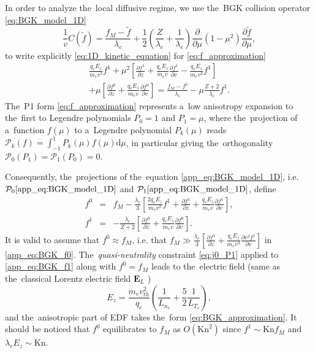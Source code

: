 \documentclass[
 aps,
 jmp,
 amsmath,amssymb,
 twocolumn,
]{revtex4-1}
\newcommand{\pdv}[2]{\frac{\partial{#1}}{\partial{#2}}}
\newcommand{\vect}[1]{\boldsymbol{#1}}
\newcommand{\dI}{\text{d}}
\newcommand{\mfpe}{\lambda_e}
\newcommand{\Zbar}{Z}
\newcommand{\vmag}{v}
\newcommand{\vth}{v_{th}}
\newcommand{\E}{\vect{E}}
\newcommand{\Ez}{E_z}
\newcommand{\qe}{q_e}
\newcommand{\me}{m_e}
\newcommand{\fM}{f_M}
\newcommand{\ft}{f}
\begin{document}
In order to analyze the~local diffusive regime, 
we use the~BGK collision operator 
\eqref{eq:BGK_model_1D} 
\begin{equation}
  \frac{1}{\vmag}C(\tilde{\ft})
  =
  \frac{\fM - \tilde{\ft}}{\mfpe}
  + \frac{1}{2}\left(\frac{\Zbar}{\mfpe} + \frac{1}{\mfpe}\right)
  \pdv{}{\mu}(1 - \mu^2)\pdv{\tilde{\ft}}{\mu} 
  ,\nonumber
\end{equation}
to write explicitly \eqref{eq:1D_kinetic_equation} 
for \eqref{eq:f_approximation} 
\begin{multline}
  \frac{\qe\Ez}{\me\vmag^2} \ft^1 
  + \mu^2\left[\pdv{\ft^1}{z} 
  + \frac{\qe\Ez}{\me\vmag}\pdv{\ft^1}{\vmag} - \frac{\qe\Ez}{\me\vmag^2} \ft^1
  \right] \\ 
  + \mu\left[\pdv{\ft^0}{z} 
  + \frac{\qe\Ez}{\me\vmag}\pdv{\ft^0}{\vmag}\right] = 
  \frac{\fM - \ft^0}{\mfpe} - \mu \frac{\Zbar + 2}{\mfpe}\ft^1
  .
  \label{app_eq:BGK_model_1D}
\end{multline}
The~P1 form \eqref{eq:f_approximation} represents a~low anisotropy
expansion to the~first to Legendre polynomials $P_0 = 1$ and $P_1 = \mu$, 
where the~projection of a~function $f(\mu)$ 
to a~Legendre polynomial $P_k(\mu)$ reads
$\mathcal{P}_k(f) = \int_{-1}^1 P_k(\mu) f(\mu) \dI\mu$, in particular giving
the~orthogonality $\mathcal{P}_0(P_1) = \mathcal{P}_1(P_0) = 0$.

Consequently, the~projections of the~equation \eqref{app_eq:BGK_model_1D}, 
i.e. $\mathcal{P}_0\eqref{app_eq:BGK_model_1D}$ 
and $\mathcal{P}_1\eqref{app_eq:BGK_model_1D}$, define 
\begin{eqnarray}
    \ft^0 &=& \fM - \frac{\mfpe}{3}\left[\frac{2\qe\Ez}{\me\vmag^2} \ft^1 
  + \pdv{\ft^1}{z} + \frac{\qe\Ez}{\me\vmag}\pdv{\ft^1}{\vmag}\right]
  ,
  \label{app_eq:BGK_f0} \\
  \ft^1 &=& - \frac{\mfpe}{\Zbar + 2}
  \left[ \pdv{\ft^0}{z} + \frac{\qe\Ez}{\me\vmag}\pdv{\ft^0}{\vmag} \right]
  . 
  \label{app_eq:BGK_f1}
\end{eqnarray}
It is valid to assume that $\ft^0 \approx \fM$, i.e. that $\fM \gg
\frac{\mfpe}{3}\left[\pdv{\ft^1}{z} +
\frac{\qe\Ez}{\me\vmag^3}\pdv{\vmag^2\ft^1}{\vmag}\right]$ 
in \eqref{app_eq:BGK_f0}. The~\textit{quasi-neutrality} constraint 
\eqref{eq:j0_P1} applied to \eqref{app_eq:BGK_f1} along with 
$\ft^0 = \fM$ leads to the~electric field 
(same as the~classical Lorentz electric field $\E_L$ \cite{Lorentz_1905})
\begin{equation}
  \Ez = \frac{\me\vth^2}{\qe}\left(\frac{1}{L_{n_e}} 
  + \frac{5}{2}\frac{1}{L_{T_e}} \right) 
  ,
  \label{app_eq:BGK_Efield}
\end{equation}
and the~anisotropic part of EDF takes the~form \eqref{eq:BGK_approximation}.
It should be noticed that $\ft^0$ equilibrates to $\fM$ 
as $O\left( \text{Kn}^2\right)$ since $\ft^1 \sim \text{Kn} \fM$ 
and $\mfpe \Ez \sim \text{Kn}$.
\end{document}
